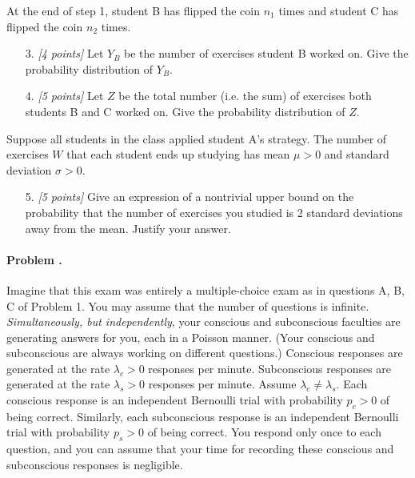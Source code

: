 \documentclass[article,12pt,a4paper]{article}
\newcounter{num}  %
\begin{document}
		At the end of step 1, student B has flipped the coin $n_1$ times and student C has flipped the coin $n_2$ times.
		\begin{enumerate}
			\item [3.]\textit{[4 points]} Let $Y_B$ be the number of exercises student B worked on.
			Give the probability distribution of $Y_B$.
			
			\vspace{6cm}
			
			\item [4.]\textit{[5 points]} Let $Z$ be the total number (i.e. the sum) of exercises both students B and C worked on. Give the probability distribution of $Z$.
			
			
			
		\end{enumerate}
		
		\newpage
		
		Suppose all students in the class applied student A's strategy. The number of exercises $W$ that each student ends up studying has mean $\mu>0$ and standard deviation $\sigma>0$.
		\begin{enumerate}
		\item [5.]\textit{[5 points]} Give an expression of a nontrivial upper bound on the probability that the number of exercises you studied is 2 standard deviations away from the mean.
		Justify your answer.
		
		
		\end{enumerate}
		\newpage
		\paragraph{Problem \thenum.}
		Imagine that this exam was entirely a multiple-choice exam as in questions A, B, C of Problem 1. 
		You may assume that the number of questions is infinite. 
		\textit{Simultaneously, but independently}, your conscious and subconscious faculties are generating answers for you, each in a Poisson manner. 
		(Your conscious and subconscious are always working on different questions.) Conscious responses are generated at the rate \( \lambda_c >0\) responses per minute. Subconscious responses are generated at the rate \( \lambda_s>0 \) responses per minute. Assume \( \lambda_c \neq \lambda_s \). 
		Each conscious response is an independent Bernoulli trial with probability \( p_c>0 \) of being correct. 
		Similarly, each subconscious response is an independent Bernoulli trial with probability \( p_s>0 \) of being correct. You respond only once to each question, and you can assume that your time for recording these conscious and subconscious responses is negligible.
		
\end{document}
